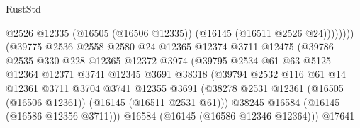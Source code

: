 \begin{lexlean}{RustStd}
\begin{coremodule}
                                              @2526
                                              @12335
                                              (@16505 (@16506 @12335))
                                              (@16145 (@16511 @2526 @24))))))))
                                  (@39775
                                    @2536
                                    @2558
                                    @2580
                                    @24
                                    @12365
                                    @12374
                                    @3711
                                    @12475
                                    (@39786
                                      @2535
                                      @330
                                      @228
                                      @12365
                                      @12372
                                      @3974
                                      (@39795
                                        @2534
                                        @61
                                        @63
                                        @5125
                                        @12364
                                        @12371
                                        @3741
                                        @12345
                                        @3691
                                        @38318
                                        (@39794
                                          @2532
                                          @116
                                          @61
                                          @14
                                          @12361
                                          @3711
                                          @3704
                                          @3741
                                          @12355
                                          @3691
                                          (@38278
                                            @2531
                                            @12361
                                            (@16505 (@16506 @12361))
                                            (@16145 (@16511 @2531 @61)))
                                          @38245
                                          @16584
                                          (@16145 (@16586 @12356 @3711)))
                                        @16584
                                        (@16145 (@16586 @12346 @12364)))
                                      @17641

\end{coremodule}
\end{lexlean}
